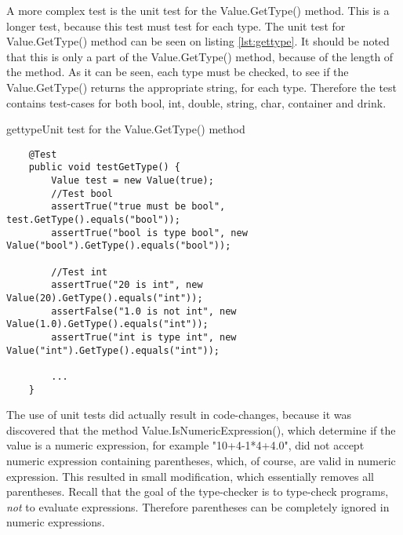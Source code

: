 
A more complex test is the unit test for the Value.GetType() method. This is a longer test, because this test must test for each type. The unit test for Value.GetType() method can be seen on listing \ref{lst:gettype}. It should be noted that this is only a part of the Value.GetType() method, because of the length of the method. As it can be seen, each type must be checked, to see if the Value.GetType() returns the appropriate string, for each type. Therefore the test contains test-cases for both bool, int, double, string, char, container and drink. 

\begin{code}{gettype}{Unit test for the Value.GetType() method}
\begin{lstlisting}
	@Test
	public void testGetType() {
	    Value test = new Value(true);
	    //Test bool
	    assertTrue("true must be bool", test.GetType().equals("bool"));
	    assertTrue("bool is type bool", new Value("bool").GetType().equals("bool"));
	    
	    //Test int
	    assertTrue("20 is int", new Value(20).GetType().equals("int"));
	    assertFalse("1.0 is not int", new Value(1.0).GetType().equals("int"));
	    assertTrue("int is type int", new Value("int").GetType().equals("int"));
	
		...    
	}
\end{lstlisting}
\end{code}

The use of unit tests did actually result in code-changes, because it was discovered that the method Value.IsNumericExpression(), which determine if the value is a numeric expression, for example "10+4-1*4+4.0", did not accept numeric expression containing parentheses, which, of course, are valid in numeric expression. This resulted in small modification, which essentially removes all parentheses. Recall that the goal of the type-checker is to type-check programs, \emph{not} to evaluate expressions. Therefore parentheses can be completely ignored in numeric expressions. 